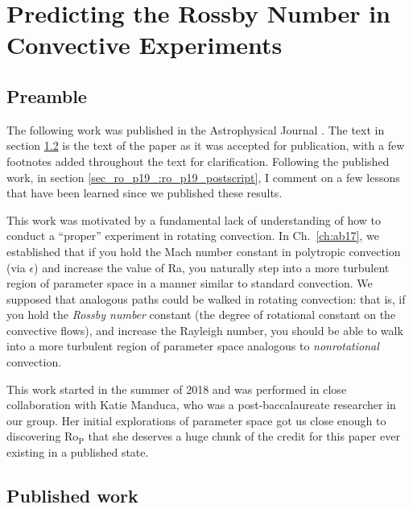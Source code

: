 \chapter{Predicting the Rossby Number in Convective Experiments}
\label{ch:ro_p19}

\section{Preamble}
The following work was published in the Astrophysical Journal \citep{anders&all2019}.
The text in section \ref{sec_ro_p19_:ro_p19_published} is the text of the paper as it was accepted for publication, with a few footnotes added throughout the text for clarification.
Following the published work, in section \ref{sec_ro_p19_:ro_p19_postscript}, I comment on a few lessons that have been learned since we published these results.

This work was motivated by a fundamental lack of understanding of how to conduct a ``proper'' experiment in rotating convection.
In Ch.~\ref{ch:ab17}, we established that if you hold the Mach number constant in polytropic convection (via $\epsilon$) and increase the value of Ra, you naturally step into a more turbulent region of parameter space in a manner similar to standard \RB convection.
We supposed that analogous paths could be walked in rotating convection: that is, if you hold the \emph{Rossby number} constant (the degree of rotational constant on the convective flows), and increase the Rayleigh number, you should be able to walk into a more turbulent region of parameter space analogous to \emph{nonrotational} \RB convection.

This work started in the summer of 2018 and was performed in close collaboration with Katie Manduca, who was a post-baccalaureate researcher in our group.
Her initial explorations of parameter space got us close enough to discovering Ro$_\text{P}$ that she deserves a huge chunk of the credit for this paper ever existing in a published state.

\section{Published work}
\label{sec_ro_p19_:ro_p19_published}

